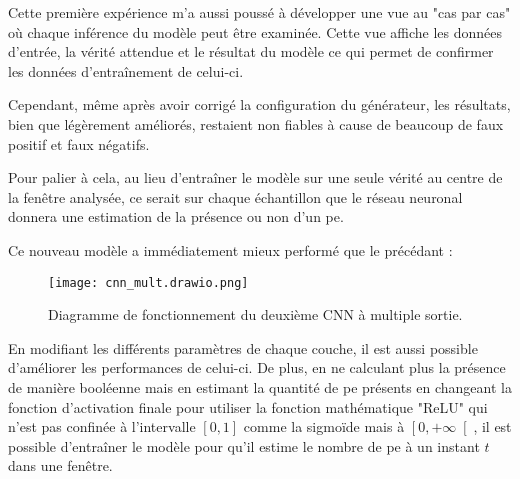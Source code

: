 Cette première expérience m'a aussi poussé à développer une vue au "cas par cas" où chaque inférence du modèle peut être examinée.
Cette vue affiche les données d'entrée, la vérité attendue et le résultat du modèle ce qui permet de confirmer les données d'entraînement de celui-ci. 

Cependant, même après avoir corrigé la configuration du générateur, les résultats, bien que légèrement améliorés, restaient non fiables à cause de beaucoup de
faux positif et faux négatifs.

Pour palier à cela, au lieu d'entraîner le modèle sur une seule vérité au centre de la fenêtre analysée, ce serait sur chaque 
échantillon que le réseau neuronal donnera une estimation de la présence ou non d'un \gls{pe}.

Ce nouveau modèle a immédiatement mieux performé que le précédant :

\begin{figure}[tbph!]
	\centering
	\texttt{[image: cnn\_mult.drawio.png]}
	\caption[Diagramme de fonctionnement du deuxième CNN à multiple sortie]{Diagramme de fonctionnement du deuxième CNN à multiple sortie.}
\end{figure}

En modifiant les différents paramètres de chaque couche, il est aussi possible d'améliorer les performances de celui-ci.
De plus, en ne calculant plus la présence de manière booléenne mais en estimant la quantité de \gls{pe} présents 
en changeant la fonction d'activation finale pour utiliser la fonction mathématique "ReLU" qui n'est pas confinée 
à l'intervalle $ \left[ 0, 1\right] $ comme la sigmoïde mais à $ \left[0, +\infty\right[ $, il est possible d'entraîner le modèle
pour qu'il estime le nombre de \gls{pe} à un instant $t$ dans une fenêtre. 